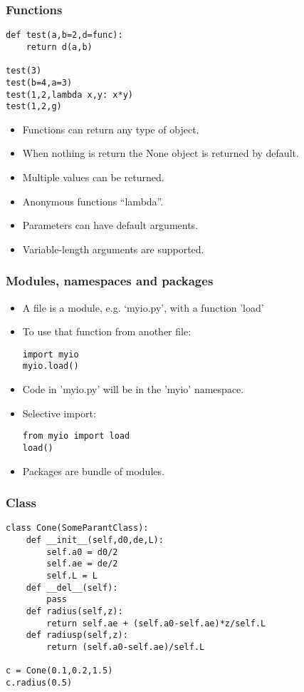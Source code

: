 \begin{frame}[fragile]\frametitle{Functions}
  \begin{lstlisting}
def test(a,b=2,d=func):
    return d(a,b)
	
test(3)
test(b=4,a=3)
test(1,2,lambda x,y: x*y)
test(1,2,g)
  \end{lstlisting}
  \begin{itemize}
  \item Functions can return any type of object.
  \item When nothing is return the None object is returned by default.
  \item Multiple values can be returned.
  \item Anonymous functions ``lambda''.
  \item Parameters can have default arguments.
  \item Variable-length arguments are supported.
  \end{itemize}
\end{frame}

\begin{frame}[fragile]\frametitle{Modules, namespaces and packages}

  \begin{itemize}
  \item A file is a module, e.g. `myio.py', with a function 'load'
  \item To use that function from another file:
    \begin{lstlisting}
import myio
myio.load()
  \end{lstlisting}
  \item Code in 'myio.py' will be in the 'myio' namespace.
  \item Selective import:
      \begin{lstlisting}
from myio import load
load()
  \end{lstlisting}
\item  Packages are bundle of modules.
  \end{itemize}
\end{frame}

\begin{frame}[fragile]\frametitle{Class}
  \begin{lstlisting}
class Cone(SomeParantClass):
	def __init__(self,d0,de,L):
		self.a0 = d0/2
		self.ae = de/2
		self.L = L
	def __del__(self):
		pass
	def radius(self,z):
		return self.ae + (self.a0-self.ae)*z/self.L
	def radiusp(self,z):
		return (self.a0-self.ae)/self.L

c = Cone(0.1,0.2,1.5)
c.radius(0.5)
  \end{lstlisting}

\end{frame}

